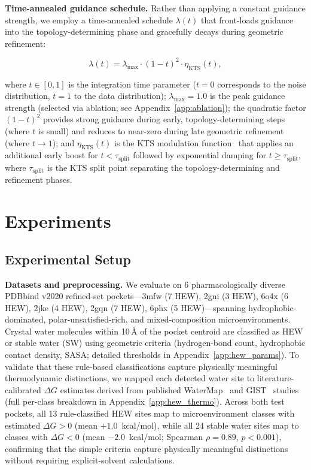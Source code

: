 \documentclass{article}
\begin{document}
\textbf{Time-annealed guidance schedule.}
Rather than applying a constant guidance strength, we employ a time-annealed
schedule $\lambda(t)$ that front-loads guidance into the topology-determining
phase and gracefully decays during geometric refinement:

\begin{equation}\label{eq:annealed_lambda}
\lambda(t) = \lambda_{\max} \cdot (1 - t)^2 \cdot \eta_{\text{KTS}}(t),
\end{equation}

where $t \in [0, 1]$ is the integration time parameter ($t = 0$ corresponds
to the noise distribution, $t = 1$ to the data distribution);
$\lambda_{\max} = 1.0$ is the peak guidance strength (selected via ablation;
see Appendix~\ref{app:ablation}); the quadratic
factor $(1-t)^2$ provides strong guidance during early, topology-determining
steps (where $t$ is small) and reduces to near-zero during late geometric
refinement (where $t \to 1$); and $\eta_{\text{KTS}}(t)$ is the KTS
modulation function~\cite{li2026kpe} that applies an additional early boost
for $t < \tau_{\text{split}}$ followed by exponential damping for $t \ge
\tau_{\text{split}}$, where $\tau_{\text{split}}$ is the KTS split point
separating the topology-determining and refinement phases.

\section{Experiments}
\label{sec:experiments}

\subsection{Experimental Setup}
\label{sec:exp_setup}

\textbf{Datasets and preprocessing.}
We evaluate on 6 pharmacologically diverse PDBbind v2020 refined-set
pockets---3mfw (7 HEW), 2gni (3 HEW), 6o4x (6 HEW), 2jke (4 HEW), 2gqn
(7 HEW), 6phx (5 HEW)---spanning hydrophobic-dominated, polar-unsatisfied-rich,
and mixed-composition microenvironments.  Crystal water molecules within
10\,\AA{} of the pocket centroid are classified as HEW or stable water (SW)
using geometric criteria (hydrogen-bond count, hydrophobic contact density,
SASA; detailed thresholds in Appendix~\ref{app:hew_params}).  To validate that
these rule-based classifications capture physically meaningful thermodynamic
distinctions, we mapped each detected water site to literature-calibrated
$\Delta G$ estimates derived from published WaterMap~\cite{abel2008} and
GIST~\cite{nguyen2012gist} studies (full per-class breakdown in
Appendix~\ref{app:hew_thermo}).  Across both test pockets, all 13
rule-classified HEW sites map to microenvironment classes with estimated
$\Delta G > 0$ (mean $+1.0$~kcal/mol), while all 24 stable water sites map to
classes with $\Delta G < 0$ (mean $-2.0$~kcal/mol; Spearman $\rho = 0.89$,
$p < 0.001$), confirming that the simple criteria capture physically meaningful
distinctions without requiring explicit-solvent calculations.
\end{document}
